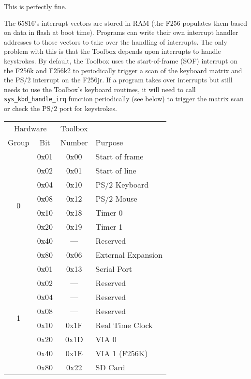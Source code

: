 This is perfectly fine.

The 65816's interrupt vectors are stored in RAM (the F256 populates them based on data in flash at boot time).
Programs can write their own interrupt handler addresses to those vectors to take over the handling of interrupts.
The only problem with this is that the Toolbox depends upon interrupts to handle keystrokes.
By default, the Toolbox uses the start-of-frame (SOF) interrupt on the F256k and F256k2 to periodically trigger a
scan of the keyboard matrix and the PS/2 interrupt on the F256jr.
If a program takes over interrupts but still needs to use the Toolbox's keyboard routines, it will need to call
\lstinline!sys_kbd_handle_irq! function periodically (see below) to trigger the matrix scan or check the PS/2 port for keystrokes.

\begin{table}
    \begin{center}
        \begin{tabular}{|c|c||c|l|} \hline 
            \multicolumn{2}{|c||}{Hardware} & Toolbox & \\
            Group & Bit & Number & Purpose \\ \hline
            \multirow{8}{*}{0} & 0x01 & 0x00 & Start of frame \\ \cline{2-4}
                & 0x02 & 0x01 & Start of line \\ \cline{2-4}
                & 0x04 & 0x10 & PS/2 Keyboard \\ \cline{2-4}
                & 0x08 & 0x12 & PS/2 Mouse \\ \cline{2-4}
                & 0x10 & 0x18 & Timer 0 \\ \cline{2-4}
                & 0x20 & 0x19 & Timer 1 \\ \cline{2-4}
                & 0x40 & ---  & Reserved \\ \cline{2-4}
                & 0x80 & 0x06 & External Expansion \\ \hline\hline

            \multirow{8}{*}{1} & 0x01 & 0x13 & Serial Port \\ \cline{2-4}
                & 0x02 & ---  & Reserved \\ \cline{2-4}
                & 0x04 & ---  & Reserved \\ \cline{2-4}
                & 0x08 & ---  & Reserved \\ \cline{2-4}
                & 0x10 & 0x1F & Real Time Clock \\ \cline{2-4}
                & 0x20 & 0x1D & VIA 0 \\ \cline{2-4}
                & 0x40 & 0x1E & VIA 1 (F256K) \\ \cline{2-4}
                & 0x80 & 0x22 & SD Card \\ \hline\hline


\end{tabular}
\end{center}
\end{table}
